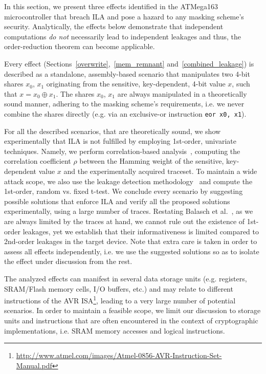 In this section, we present three effects identified in the ATMega163 microcontroller that breach ILA and pose a hazard to any masking scheme's security. Analytically, the effects below demonstrate that independent computations \emph{do not} necessarily lead to independent leakages and thus, the order-reduction theorem can become applicable.

Every effect (Sections~\ref{overwrite},~\ref{mem_remnant} and~\ref{combined_leakage}) is described as a standalone, assembly-based scenario that manipulates two 4-bit shares $x_0$, $x_1$ originating from the sensitive, key-dependent, 4-bit value $x$, such that $x=x_0 \oplus x_1$. The shares $x_0$, $x_1$ are always manipulated in a theoretically sound manner, adhering to the masking scheme's requirements, i.e. we never combine the shares directly (e.g. via an exclusive-or instruction \texttt{eor x0, x1}). 

For all the described scenarios, that are theoretically sound, we show experimentally that ILA is not fulfilled by employing 1st-order, univariate techniques. Namely, we perform correlation-based analysis~\cite{DBLP:conf/ches/BrierCO04}, computing the correlation coefficient $\rho$ between the Hamming weight of the sensitive, key-dependent value $x$ and the experimentally acquired traceset. To maintain a wide attack scope, we also use the leakage detection methodology~\cite{tvla,DBLP:conf/ches/SchneiderM15} and compute the 1st-order, random vs. fixed t-test. 
 We conclude every scenario by suggesting possible solutions that enforce ILA and verify all the proposed solutions experimentally, using a large number of traces. Restating Balasch et al.~\cite{DBLP:conf/cardis/BalaschGGRS14}, as we are always limited by the traces at hand, we cannot rule out the existence of 1st-order leakages, yet we establish that their informativeness is limited compared to 2nd-order leakages in the target device. Note that extra care is taken in order to assess all effects independently, i.e. we use the suggested solutions so as to isolate the effect under discussion from the rest.

The analyzed effects can manifest in several data storage units (e.g. registers, SRAM/Flash memory cells, I/O buffers, etc.) and may relate to different instructions of the AVR ISA\footnote{\url{http://www.atmel.com/images/Atmel-0856-AVR-Instruction-Set-Manual.pdf}}, leading to a very large number of potential scenarios. In order to maintain a feasible scope, we limit our discussion to storage units and instructions that are often encountered in the context of cryptographic implementations, i.e. SRAM memory accesses and logical instructions.

